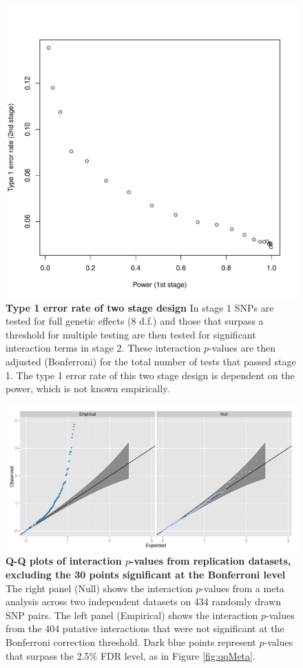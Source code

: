 \documentclass{article}
\begin{document}
\begin{figure}[H]
	\centering
	\includegraphics[width=5in]{type1}
	\caption{\textbf{Type 1 error rate of two stage design} In stage 1 SNPs are tested for full genetic effects (8 d.f.) and those that surpass a threshold for multiple testing are then tested for significant interaction terms in stage 2. These interaction $p$-values are then adjusted (Bonferroni) for the total number of tests that passed stage 1. The type 1 error rate of this two stage design is dependent on the power, which is not known empirically.}
\label{fig:type1}
\end{figure}
\clearpage

\begin{figure}[H]
	\centering
	\includegraphics[width=5in]{qqMetaNonsig}
	\caption{\textbf{Q-Q plots of interaction $p$-values from replication datasets, excluding the 30 points significant at the Bonferroni level} The right panel (Null) shows the interaction $p$-values from a meta analysis across two independent datasets on 434 randomly drawn SNP pairs. The left panel (Empirical) shows the interaction $p$-values from the 404 putative interactions that were not significant at the Bonferroni correction threshold. Dark blue points represent $p$-values that surpass the 2.5\% FDR level, as in Figure \ref{fig:qqMeta}.}
\label{fig:qqMetaNonsig}
\end{figure}
\clearpage
\end{document}
